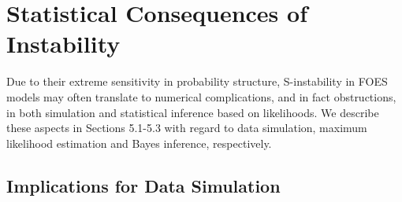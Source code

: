 \documentclass[12pt]{article}
\newcommand{\blue}[1]{{\color{blue} #1}}
\theoremstyle{definition}
\begin{document}
\blue{



\section{Statistical Consequences of Instability}\label{implications}

Due to their extreme sensitivity in probability structure, S-instability
in FOES models may often translate to numerical complications, and in fact
obstructions, in both simulation and statistical inference based on
likelihoods.  We describe these aspects in Sections 5.1-5.3 with regard to data simulation, maximum likelihood estimation and
Bayes inference, respectively.

\subsection{Implications for Data Simulation}

}
\end{document}
